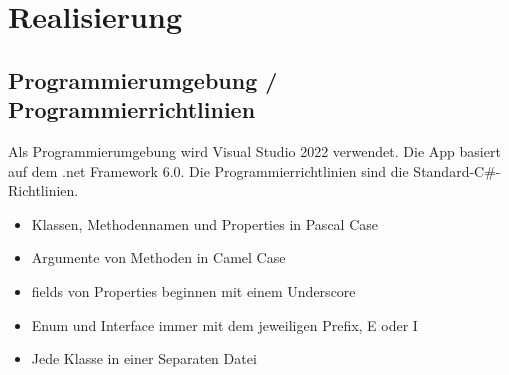 \section{Realisierung}

\subsection{Programmierumgebung / Programmierrichtlinien}
Als Programmierumgebung wird Visual Studio 2022 verwendet. Die App basiert auf dem .net Framework 6.0. Die Programmierrichtlinien sind die Standard-C\#-Richtlinien.
\begin{itemize}
  \item Klassen, Methodennamen und Properties in Pascal Case
  \item Argumente von Methoden in Camel Case
  \item fields von Properties beginnen mit einem Underscore
  \item Enum und Interface immer mit dem jeweiligen Prefix, E oder I
  \item Jede Klasse in einer Separaten Datei
\end{itemize}

